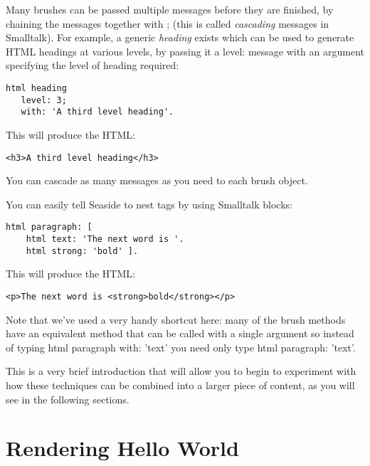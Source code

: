 \documentclass[a4paper,10pt,twoside]{book}
\newcommand{\ct}[1]{{\small\ttfamily\textup{#1}}}
\begin{document}
Many brushes can be passed multiple messages before they are finished, by chaining the messages together with \ct{;} (this is called \textit{cascading} messages in Smalltalk). For example, a generic \textit{heading} exists which can be used to generate HTML headings at various levels, by passing it a \ct{level:} message with an argument specifying the level of heading required:

\begin{lstlisting}
html heading
   level: 3;
   with: 'A third level heading'.
\end{lstlisting}

This will produce the HTML:

\begin{lstlisting}
<h3>A third level heading</h3>
\end{lstlisting}

You can cascade as many messages as you need to each brush object.

You can easily tell Seaside to nest tags by using Smalltalk blocks:

\begin{lstlisting}
html paragraph: [
    html text: 'The next word is '.
    html strong: 'bold' ].
\end{lstlisting}

This will produce the HTML:

\begin{lstlisting}
<p>The next word is <strong>bold</strong></p>
\end{lstlisting}

Note that we've used a very handy shortcut here: many of the brush methods have an equivalent method that can be called with a single argument so instead of typing \ct{html paragraph with: 'text'} you need only type \ct{html paragraph: 'text'}.

This is a very brief introduction that will allow you to begin to experiment with how these techniques can be combined into a larger piece of content, as you will see in the following sections. 

\section{Rendering Hello World}
\label{book:fundamentals:renderingcomponents:renderinghelloworld}
\end{document}
